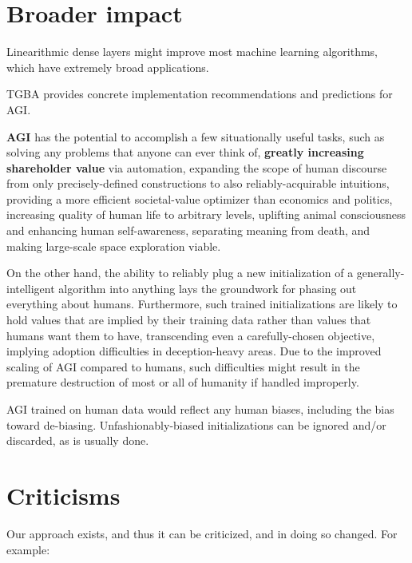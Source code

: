 \documentclass{article}
\begin{document}
\section{Broader impact}


Linearithmic dense layers might improve most machine learning algorithms, which have extremely broad applications.

TGBA provides concrete implementation recommendations and predictions for AGI.

\textbf{AGI} has the potential to accomplish a few situationally useful tasks, such as solving any problems that anyone can ever think of, \textbf{greatly increasing shareholder value} via automation, expanding the scope of human discourse from only precisely-defined constructions to also reliably-acquirable intuitions, providing a more efficient societal-value optimizer than economics and politics, increasing quality of human life to arbitrary levels, uplifting animal consciousness and enhancing human self-awareness, separating meaning from death, and making large-scale space exploration viable.

On the other hand, the ability to reliably plug a new initialization of a generally-intelligent algorithm into anything lays the groundwork for phasing out everything about humans. Furthermore, such trained initializations are likely to hold values that are implied by their training data rather than values that humans want them to have, transcending even a carefully-chosen objective, implying adoption difficulties in deception-heavy areas. Due to the improved scaling of AGI compared to humans, such difficulties might result in the premature destruction of most or all of humanity if handled improperly.

AGI trained on human data would reflect any human biases, including the bias toward de-biasing. Unfashionably-biased initializations can be ignored and/or discarded, as is usually done.

\section{Criticisms}

Our approach exists, and thus it can be criticized, and in doing so changed. For example:
\end{document}

